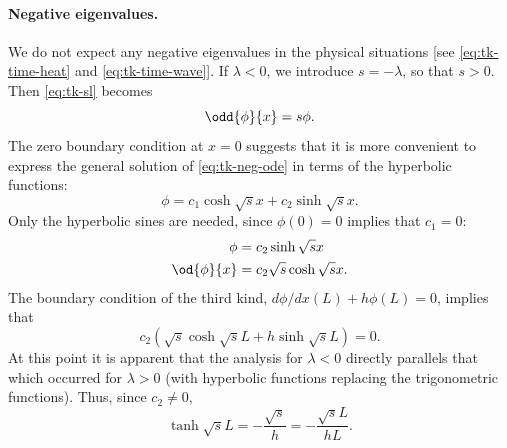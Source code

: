 \paragraph{Negative eigenvalues.}
We do not expect any negative eigenvalues in the physical situations [see \eqref{eq:tk-time-heat} and \eqref{eq:tk-time-wave}].  If $\lambda < 0$, we introduce $s = -\lambda$, so that $s > 0$.  Then \eqref{eq:tk-sl} becomes
\begin{equation}
\label{eq:tk-neg-ode}
\odd{\phi}{x} = s\phi.
\end{equation}
The zero boundary condition at $x = 0$ suggests that it is more convenient to express the general solution of \eqref{eq:tk-neg-ode} in terms of the hyperbolic functions:
\begin{equation}
\label{eq:tk-neg-soln}
\phi = c_1\cosh\sqrt{s}x + c_2\sinh\sqrt{s}x.
\end{equation}
Only the hyperbolic sines are needed, since $\phi(0) = 0$ implies that $c_1 = 0$:
\begin{equation}
\label{eq:tk-neg-sinh}
\begin{aligned}
\phi &= c_2\sinh\sqrt{s}x \\
\od{\phi}{x} &= c_2\sqrt{s}\cosh\sqrt{s}x.
\end{aligned}
\end{equation}
The boundary condition of the third kind, $d\phi/dx(L) + h\phi(L) = 0$, implies that
\begin{equation}
\label{eq:tk-neg-trans}
c_2(\sqrt{s}\cosh\sqrt{s}L + h\sinh\sqrt{s}L) = 0.
\end{equation}
At this point it is apparent that the analysis for $\lambda < 0$ directly parallels that which occurred for $\lambda > 0$ (with hyperbolic functions replacing the trigonometric functions).  Thus, since $c_2 \neq 0$,
\begin{equation}
\label{eq:tk-tanh}
\boxed{\tanh\sqrt{s}L = -\frac{\sqrt{s}}{h} = -\frac{\sqrt{s}L}{hL}.}
\end{equation}

